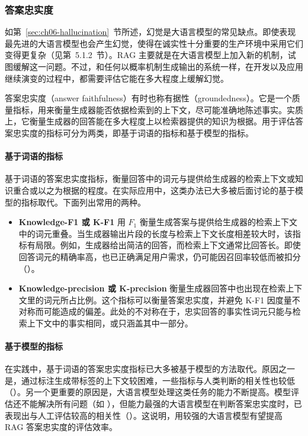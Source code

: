 \subsubsection{答案忠实度}
如第~\ref{sec:ch06-hallucination}~节所述，幻觉是大语言模型的常见缺点。即使表现最先进的大语言模型也会产生幻觉，使得在诚实性十分重要的生产环境中采用它们变得更复杂（见第~5.1.2~节）。RAG 主要就是在大语言模型上加入新的机制，试图缓解这一问题。不过，和任何以概率机制生成输出的系统一样，在开发以及应用继续演变的过程中，都需要评估它能在多大程度上缓解幻觉。

答案忠实度（answer faithfulness）有时也称有据性（groundedness）。它是一个质量指标，用来衡量生成器能否依据检索到的上下文，尽可能准确地陈述事实。实质上，它衡量生成器的回答能在多大程度上以检索器提供的知识为根据。用于评估答案忠实度的指标可分为两类，即基于词语的指标和基于模型的指标。

\paragraph*{基于词语的指标}
基于词语的答案忠实度指标，衡量回答中的词元与提供给生成器的检索上下文或知识重合或以之为根据的程度。在实际应用中，这类办法已大多被后面讨论的基于模型的指标取代。下面列出常用的两种。

\begin{itemize}
\item \textbf{Knowledge-F1 或 K-F1} 用 $F_1$ 衡量生成答案与提供给生成器的检索上下文中的词元重叠。当生成器输出片段的长度与检索上下文长度相差较大时，该指标有局限。例如，生成器给出简洁的回答，而检索上下文通常比回答长。即使回答词元的精确率高，也已正确满足用户需求，仍可能因召回率较低而被扣分（）。
\item \textbf{Knowledge-precision 或 K-precision} 衡量生成器回答中也出现在检索上下文里的词元所占比例。这个指标可以衡量答案忠实度，并避免 K-F1 因度量不对称而可能造成的偏差。此处的不对称在于，忠实回答的事实性词元只能与检索上下文中的事实相同，或只涵盖其中一部分。
\end{itemize}

\paragraph*{基于模型的指标}
在实践中，基于词语的答案忠实度指标已大多被基于模型的方法取代。原因之一是，通过标注生成带标签的上下文较困难，一些指标与人类判断的相关性也较低（）。另一个更重要的原因是，大语言模型处理这类任务的能力不断提高。模型评估还不能解决所有问题（如 ），但能力最强的大语言模型在判断答案忠实度时，已表现出与人工评估较高的相关性（）。这说明，用较强的大语言模型有望提高 RAG 答案忠实度的评估效率。

